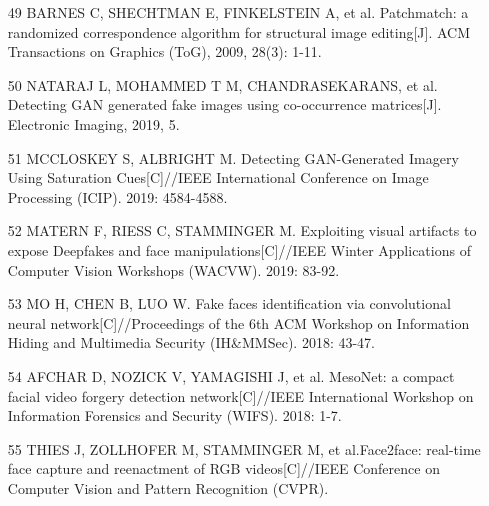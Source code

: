 \documentclass{article}
\begin{document}
\begin{itemize}
\item 
[49] BARNES C, SHECHTMAN E, FINKELSTEIN A, et al. Patchmatch: a randomized correspondence algorithm for structural image editing[J]. ACM Transactions on Graphics (ToG), 2009, 28(3): 1-11.

\item 
[50] NATARAJ L, MOHAMMED T M, CHANDRASEKARANS, et al. Detecting GAN generated fake images using co-occurrence matrices[J]. Electronic Imaging, 2019, 5.

\item 
[51] MCCLOSKEY S, ALBRIGHT M. Detecting GAN-Generated Imagery Using Saturation Cues[C]//IEEE International Conference on Image Processing (ICIP). 2019: 4584-4588.

\item 
[52] MATERN F, RIESS C, STAMMINGER M. Exploiting visual artifacts to expose Deepfakes and face manipulations[C]//IEEE Winter Applications of Computer Vision Workshops (WACVW). 2019: 83-92.

\item 
[53] MO H, CHEN B, LUO W. Fake faces identification via convolutional neural network[C]//Proceedings of the 6th ACM Workshop on Information Hiding and Multimedia Security (IH\&MMSec). 2018: 43-47.

\item 
[54] AFCHAR D, NOZICK V, YAMAGISHI J, et al. MesoNet: a compact facial video forgery detection network[C]//IEEE International Workshop on Information Forensics and Security (WIFS). 2018: 1-7.

\item 
[55] THIES J, ZOLLHOFER M, STAMMINGER M, et al.Face2face: real-time face capture and reenactment of RGB videos[C]//IEEE Conference on Computer Vision and Pattern Recognition (CVPR).

\end{itemize}
\end{document}
